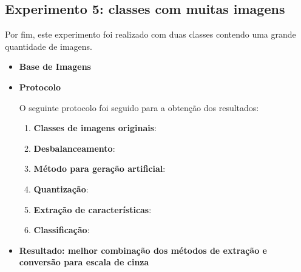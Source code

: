 \FloatBarrier
\subsection{Experimento 5: classes com muitas imagens}

Por fim, este experimento foi realizado com duas classes contendo uma grande quantidade de imagens.

\begin{itemize}
\item[] \textbf{Base de Imagens}


\item[] \textbf{Protocolo}

O seguinte protocolo foi seguido para a obtenção dos resultados:

\begin{enumerate}
\item \textbf{Classes de imagens originais}:
\item \textbf{Desbalanceamento}:
\item \textbf{Método para geração artificial}:
\item \textbf{Quantização}:
\item \textbf{Extração de características}:
\item \textbf{Classificação}:
\end{enumerate}
\item[] \textbf{Resultado: melhor combinação dos métodos de extração e conversão para escala de cinza}


\end{itemize}
